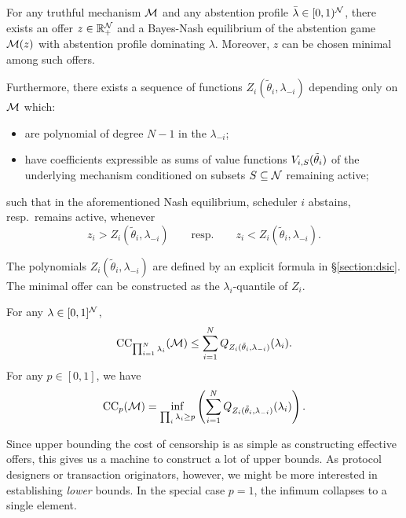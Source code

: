 \begin{theorem}

  For any truthful mechanism $\mathcal{M}$ and any abstention profile $\bar\lambda\in[0,1)^{\mathcal{N}}$, there exists an offer $z\in\mathbb{R}_+^{\mathcal{N}}$ and a Bayes-Nash equilibrium of the abstention game $\mathcal{M}(z)$ with abstention profile dominating $\lambda$. 
  Moreover, $z$ can be chosen minimal among such offers.
  
  Furthermore, there exists a sequence of functions $Z_i(\tilde\theta_i,\lambda_{-i})$ depending only on $\mathcal{M}$ which:
  \begin{itemize}
    \item
      are polynomial of degree $N-1$ in the $\lambda_{-i}$;
    \item
      have coefficients expressible as sums of value functions $V_{i,S}(\tilde\theta_i)$ of the underlying mechanism conditioned on subsets $S\subseteq\mathcal{N}$ remaining active;
  \end{itemize}
  such that in the aforementioned Nash equilibrium, scheduler $i$ abstains, resp.~remains active, whenever
  \[
    z_i > Z_i(\tilde\theta_i,\lambda_{-i}) \qquad \text{resp.} \qquad z_i < Z_i(\tilde\theta_i,\lambda_{-i}).
  \]
  
\end{theorem}

The polynomials $Z_i(\tilde\theta_i,\lambda_{-i})$ are defined by an explicit formula in \S\ref{section:dsic}.
%
The minimal offer can be constructed as the $\lambda_i$-quantile of $Z_i$.

\begin{corollary}

  For any $\lambda\in[0,1]^{\mathcal{N}}$,
  \[
    \mathrm{CC}_{\prod_{i=1}^N\lambda_i}(\mathcal{M}) \leq \sum_{i=1}^N Q_{Z_i(\tilde\theta_i,\lambda_{-i})}(\lambda_i) .
  \]
  For any $p\in[0,1]$, we have
  \[
    \mathrm{CC}_{p}(\mathcal{M}) = \inf_{\prod_i\lambda_i \geq p} \left(\sum_{i=1}^N Q_{Z_i(\tilde\theta_i,\lambda_{-i})}(\lambda_i) \right).
  \]
  

\end{corollary}


Since upper bounding the cost of censorship is as simple as constructing effective offers, this gives us a machine to construct a lot of upper bounds.
%
As protocol designers or transaction originators, however, we might be more interested in establishing \emph{lower} bounds.
%
In the special case $p=1$, the infimum collapses to a single element.

